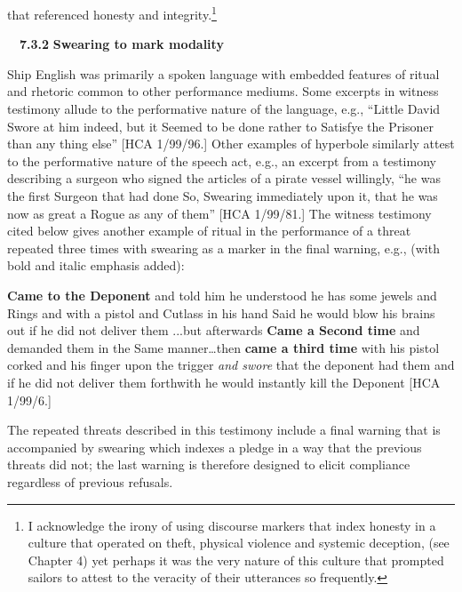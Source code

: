 \begin{styleStandard}
that referenced honesty and integrity.\footnote{ I acknowledge the irony of using discourse markers that index honesty in a culture that operated on theft, physical violence and systemic deception, (see Chapter 4) yet perhaps it was the very nature of this culture that prompted sailors to attest to the veracity of their utterances so frequently. }
\end{styleStandard}

\begin{styleStandard}
\ \ \textbf{7.3.2} \textbf{Swearing to mark modality}
\end{styleStandard}

\begin{styleStandard}
Ship English was primarily a spoken language with embedded features of ritual and rhetoric common to other performance mediums. Some excerpts in witness testimony allude to the performative nature of the language, e.g., “Little David Swore at him indeed, but it Seemed to be done rather to Satisfye the Prisoner than any thing else” [HCA 1/99/96.] Other examples of hyperbole similarly attest to the performative nature of the speech act, e.g., an excerpt from a testimony describing a surgeon who signed the articles of a pirate vessel willingly, “he was the first Surgeon that had done So, Swearing immediately upon it, that he was now as great a Rogue as any of them” [HCA 1/99/81.] The witness testimony cited below gives another example of ritual in the performance of a threat repeated three times with swearing as a marker in the final warning, e.g., (with bold and italic emphasis added):
\end{styleStandard}

\begin{styleStandard}
[he] \textbf{Came to the Deponent} and told him he understood he has some jewels and Rings and with a pistol and Cutlass in his hand Said he would blow his brains out if he did not deliver them ...but afterwards \textbf{Came a Second time} and demanded them in the Same manner…then \textbf{came a third time} with his pistol corked and his finger upon the trigger\textit{ and swore }that the deponent had them and if he did not deliver them forthwith he would instantly kill the Deponent [HCA 1/99/6.] 
\end{styleStandard}

\begin{styleStandard}
The repeated threats described in this testimony include a final warning that is accompanied by swearing which indexes a pledge in a way that the previous threats did not; the last warning is therefore designed to elicit compliance regardless of previous refusals. 
\end{styleStandard}

